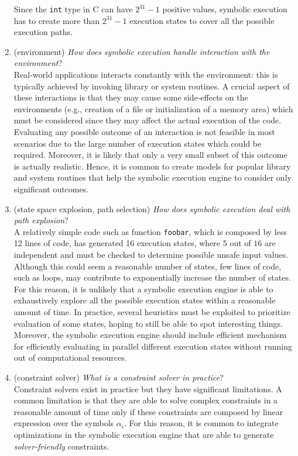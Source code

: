 \begin{enumerate}
  Since the {\tt int} type in C can have $2^{31} - 1$ positive values, symbolic execution has to create more than $2^{31} - 1$  execution states to cover all the possible execution paths.
 
  \item (environment) {\em How does symbolic execution handle interaction with the environment}? \\
  Real-world applications interacts constantly with the environment: this is typically achieved by invoking library or system routines. A crucial aspect of these interactions is that they may cause some side-effects on the environments (e.g., creation of a file or initialization of a memory area) which must be considered since they may affect the actual execution of the code. Evaluating any possible outcome of an interaction is not feasible in most scenarios due to the large number of execution states which could be required. Moreover, it is likely that only a very small subset of this outcome is actually realistic. Hence, it is common to create models for popular library and system routines that help the symbolic execution engine to consider only significant outcomes.

  \item (state space explosion, path selection) {\em How does symbolic execution deal with path explosion}? \\
  A relatively simple code such as function {\tt foobar}, which is composed by less 12 lines of code, has generated 16 execution states, where $5$ out of $16$ are independent and must be checked to determine possible unsafe input values. Although this could seem a reasonable number of states, few lines of code, such as loops, may contribute to exponentially increase the number of states. For this reason, it is unlikely that a symbolic execution engine is able to exhaustively explore all the possible execution states within a reasonable amount of time. In practice, several heuristics must be exploited to prioritize evaluation of some states, hoping to still be able to spot interesting things. Moreover, the symbolic execution engine should include efficient mechanism for efficiently evaluating in parallel different execution states without running out of computational resources.

  \item (constraint solver) {\em What is a constraint solver in practice}? \\
  Constraint solvers exist in practice but they have significant limitations. A common limitation is that they are able to solve complex constraints in a reasonable amount of time only if these constraints are composed by linear expression over the symbols $\alpha_i$. For this reason, it is common to integrate optimizations in the symbolic execution engine that are able to generate {\em solver-friendly} constraints.


\end{enumerate}
